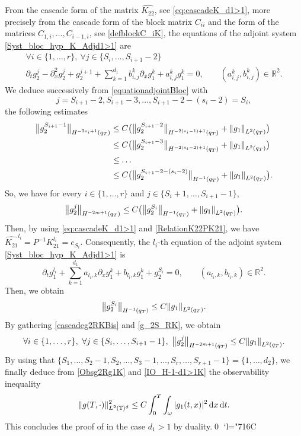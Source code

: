 \documentclass[10pt]{amsart}
\newcommand{\Changelback}{\mathcode`l="716C}
\theoremstyle{plain}
\theoremstyle{definition}
\theoremstyle{remark}
\newcommand{\norme}[1]{\left\lVert#1\right\rVert}
\newcommand{\bnorme}[1]{\bigl\lVert#1\bigr\rVert}
\newcommand{\diff}[1][-3]{\ensuremath{\mathop{}\mkern#1mu\mathrm{d}}}
\newcommand{\set}{\mathbb}
\newcommand{\R}{} %
\renewcommand{\R}{\set{R}}
\newcommand{\T}{\set{T}}
\let\originalleft\left
\let\originalright\right
\renewcommand{\left}{\mathopen{}\mathclose\bgroup\originalleft}
\renewcommand{\right}{\aftergroup\egroup\originalright}
\begin{document}
From the cascade form of the matrix $\widehat{K_{22}}$, see \eqref{eq:cascadeK_d1>1}, more precisely from the cascade form of the block matrix $C_{ii}$ and the form of the matrices $C_{1,i}, \dots, C_{i-1,i}$, see \eqref{defblockC_iK}, the equations of the adjoint system \eqref{Syst_bloc_hyp_K_Adjd1>1} are
\begin{multline}
\label{equationadjointBloc}
\forall i \in \{1, \dots, r\},\ \forall j \in \{S_i, \dots, S_{i+1}-2\}\\
\partial_t g_2^{j} - \partial_x^2 g_2^{j} + g_2^{j+1} + \sum_{k=1}^{d_1} b_{i,j}^k \partial_x g_1^k + a_{i,j}^k g_1^k =0,\qquad (a_{i,j}^k,b_{i,j}^k) \in \R^2.
\end{multline}
We deduce successively from \eqref{equationadjointBloc} with
\[
j=S_{i+1}-2, S_{i+1}-3, \dots, S_{i+1}-2-(s_{i}-2) = S_i,
\]
the following estimates
\begin{align*}
\bnorme{g_2^{S_{i+1}-1}}_{H^{-2s_i+1}(q_T)} & \leq C \bigl(\bnorme{g_2^{S_{i+1}-2}}_{H^{-2(s_i-1)+1}(q_T)} + \norme{g_1}_{L^2(q_T)}\bigr)\notag\\
& \leq C \bigl(\bnorme{g_2^{S_{i+1}-3}}_{H^{-2(s_i-2)+1}(q_T)} + \norme{g_1}_{L^2(q_T)}\bigr) \notag\\
& \leq \dots\label{cascadeg2RK}\\
& \leq C \bigl(\bnorme{g_2^{S_{i+1} -2 -(s_i-2)}}_{H^{-1}(q_T)} + \norme{g_1}_{L^2(q_T)}\bigr). \notag
\end{align*}
So, we have for every $i \in \{1, \dots, r\}$ and $j \in \{S_i+1, \dots, S_{i+1}-1\}$,
\begin{equation}
\label{cascadeg2RKBis}
\bnorme{g_2^{j}}_{H^{-2m+1}(q_T)} \leq C\bigl(\bnorme{g_2^{S_i}}_{H^{-1}(q_T)} + \norme{g_1}_{L^2(q_T)}\bigr).
\end{equation}
Then, by using \eqref{eq:cascadeK_d1>1} and \eqref{RelationK22PK21}, we have $\widehat{K_{21}}^{l_i}=P^{-1} K_{21}^{l_i} = e_{S_i}$. Consequently, the $l_i$-th equation of the adjoint system \eqref{Syst_bloc_hyp_K_Adjd1>1} is
\begin{equation*}
\partial_t g_1^{l_i} + \sum_{k=1}^{d_1} a_{l_i,k} \partial_x g_1^{k} + b_{l_i,k} g_1^{k} + g_2^{S_i} = 0,\qquad (a_{l_i,k}, b_{l_i,k}) \in \R^2.
\end{equation*}
Then, we obtain
\begin{equation}
\label{g_2S_RK}
\bnorme{g_2^{S_i}}_{H^{-1}(q_T)} \leq C \norme{g_1}_{L^2(q_T)}.
\end{equation}
By gathering \eqref{cascadeg2RKBis} and \eqref{g_2S_RK}, we obtain
\begin{equation}
\label{Obsg2Rg1K}
\forall i \in \{1, \dots, r\},\ \forall j \in \{S_i, \dots, S_{i+1}-1\},\ \bnorme{g_2^{j}}_{H^{-2m+1}(q_T)} \leq C \norme{g_1}_{L^2(q_T)}.
\end{equation}
By using that $\{S_1, \dots, S_{2}-1, S_2, \dots, S_{3}-1, \dots, S_{r}, \dots, S_{r+1}-1\} = \{1, \dots, d_2\}$, we finally deduce from \eqref{Obsg2Rg1K} and \eqref{IO_H-1-d1>1K}
the observability inequality\[
\| g(T,\cdot) \|_{L^2(\T)^{d}}^2 \leq C \int_0^T \int_{\omega} |g_1(t,x)|^2 \diff x \diff t.
\]
This concludes the proof of  in the case $d_1>1$ by duality.\qed
\Changelback
\end{document}

